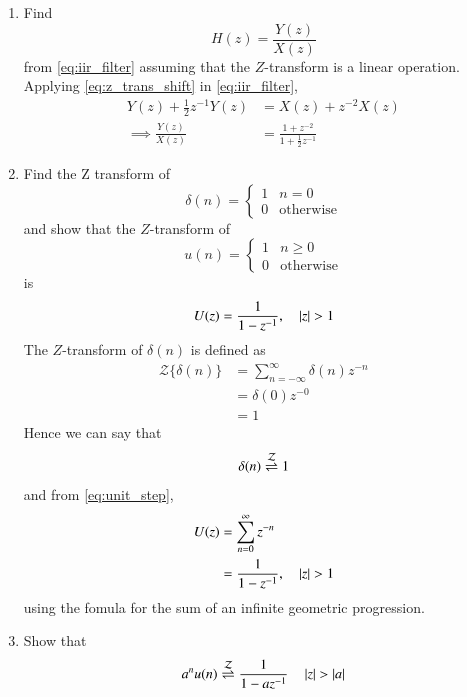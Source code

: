 \documentclass[journal,12pt,twocolumn]{IEEEtran}
\renewcommand\thesection{\arabic{section}}
\begin{document}
\begin{enumerate}[label=\thesection.\arabic*]
\item Find
%
\begin{equation}
H(z) = \frac{Y(z)}{X(z)}
\end{equation}
%
from  \eqref{eq:iir_filter} assuming that the $Z$-transform is a linear operation.
\\
\solution  Applying \eqref{eq:z_trans_shift} in \eqref{eq:iir_filter},
\begin{align}
Y(z) + \frac{1}{2}z^{-1}Y(z) &= X(z)+z^{-2}X(z)
\\
\implies \frac{Y(z)}{X(z)} &= \frac{1 + z^{-2}}{1 + \frac{1}{2}z^{-1}}
\label{eq:freq_resp}
\end{align}
%
\item Find the Z transform of 
\begin{equation}
\delta(n)
=
\begin{cases}
1 & n = 0
\\
0 & \text{otherwise}
\end{cases}
\end{equation}
and show that the $Z$-transform of
\begin{equation}
\label{eq:unit_step}
u(n)
=
\begin{cases}
1 & n \ge 0
\\
0 & \text{otherwise}
\end{cases}
\end{equation}
is
\begin{equation}
U(z) = \frac{1}{1-z^{-1}}, \quad \left\vert z\right\vert > 1
\end{equation}
\solution The $Z$-transform of $\delta(n)$ is defined as
\begin{align}
	{\mathcal {Z}}\{\delta(n)\}&=\sum _{n=-\infty }^{\infty }\delta(n)z^{-n}\\
	&=\delta(0)z^{-0}\\
	&=1
\end{align}
Hence we can say that
\begin{equation}
\label{eq:z_trans1}
\delta(n) \overset{\mathcal{Z}}{ \rightleftharpoons} 1
\end{equation}
and from \eqref{eq:unit_step},
\begin{align}
U(z) &= \sum _{n= 0}^{\infty}z^{-n}
\\
&=\frac{1}{1-z^{-1}}, \quad \left\vert z\right\vert > 1
\end{align}
using the fomula for the sum of an infinite geometric progression.
%
\item Show that 
\begin{equation}
\label{eq:anun}
a^nu(n) \ztrans \frac{1}{1-az^{-1}} \quad \abs{z} > \abs{a}

\end{equation}
\end{enumerate}
\end{document}
